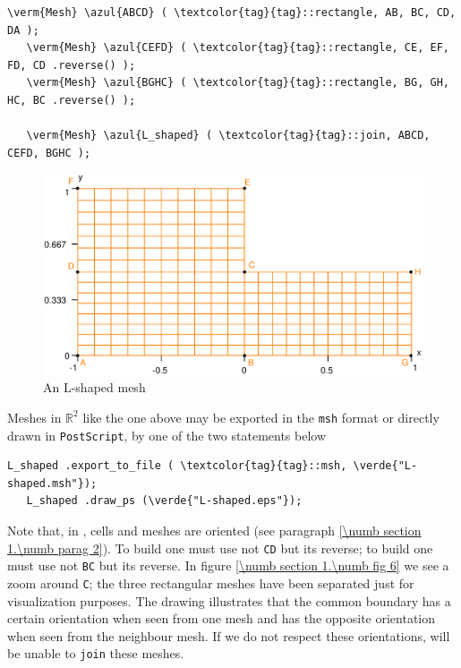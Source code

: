 \begin{Verbatim}[commandchars=\\\{\},formatcom=\small\tt,frame=single,
   label=parag-\ref{\numb section 1.\numb parag 4}.cpp,rulecolor=\color{moldura},
   baselinestretch=0.94,framesep=2mm]
   \verm{Mesh} \azul{ABCD} ( \textcolor{tag}{tag}::rectangle, AB, BC, CD, DA );
   \verm{Mesh} \azul{CEFD} ( \textcolor{tag}{tag}::rectangle, CE, EF, FD, CD .reverse() );
   \verm{Mesh} \azul{BGHC} ( \textcolor{tag}{tag}::rectangle, BG, GH, HC, BC .reverse() );

   \verm{Mesh} \azul{L_shaped} ( \textcolor{tag}{tag}::join, ABCD, CEFD, BGHC );
\end{Verbatim}

\begin{figure}[ht] \centering
  \includegraphics[width=115mm]{L-shaped}
  \caption{An L-shaped mesh}
  \label{\numb section 1.\numb fig 5}
\end{figure}

Meshes in $ \mathbb{R}^2 $ like the one above may be exported in the {\small\tt msh} format
or directly drawn in {\small\tt PostScript}, by one of the two statements below

\begin{Verbatim}[commandchars=\\\{\},formatcom=\small\tt,baselinestretch=0.94]
   L_shaped .export_to_file ( \textcolor{tag}{tag}::msh, \verde{"L-shaped.msh"});
   L_shaped .draw_ps (\verde{"L-shaped.eps"});
\end{Verbatim}

Note that, in \maniFEM, cells and meshes are oriented
(see paragraph \ref{\numb section 1.\numb parag 2}).
To build {\small\tt {}} one must use not {\small\tt CD} but its reverse;
to build {\small\tt {}} one must use not {\small\tt BC} but its reverse.
In figure \ref{\numb section 1.\numb fig 6} we see a zoom around {\small\tt C};
the three rectangular meshes have been separated just for visualization purposes.
The drawing illustrates that the common boundary has a certain orientation when seen
from one mesh and has the opposite orientation when seen from the neighbour mesh.
If we do not respect these orientations, {\maniFEM} will be unable to {\small\tt join}
these meshes.

